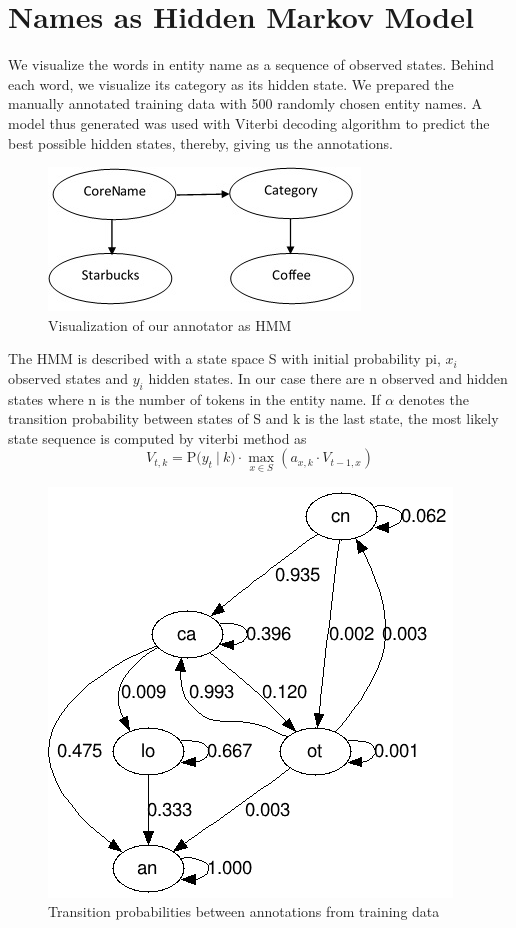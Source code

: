 \documentclass{acm_proc_article-sp}
\begin{document}
\section{Names as Hidden Markov Model}
We visualize the words in entity name as a sequence of observed states. Behind each word, we visualize its category as its hidden state. We prepared the manually annotated training data with 500 randomly chosen entity names. A model thus generated was used with Viterbi decoding algorithm to predict the best possible hidden states, thereby, giving us the annotations.

\begin{figure}[!ht]
\begin{center}
\includegraphics[scale=0.5]{namehmm.jpg}
\end{center}
\caption{
Visualization of our annotator as HMM
}
\label{figure1}
\end{figure}

The HMM is described with a state space S with initial probability pi, $x_i$ observed states and $y_i$ hidden states. In our case there are n  observed and hidden states where n is the number of tokens in the entity name. If $\alpha$ denotes the transition probability between states of S and k is the last state, the most likely state sequence is computed by viterbi method as
$$
V_{{t,k}} = {\mathrm  {P}}{\big (}y_{t}\ |\ k{\big )}\cdot \max _{{x\in S}} (a_{{x,k}}\cdot V_{{t-1,x}})
$$

\begin{figure}[!ht]
\begin{center}
\includegraphics[scale=0.3]{probtrans.png}
\end{center}
\caption{
Transition probabilities between annotations from training data
}
\label{figure1}
\end{figure}
\end{document}

